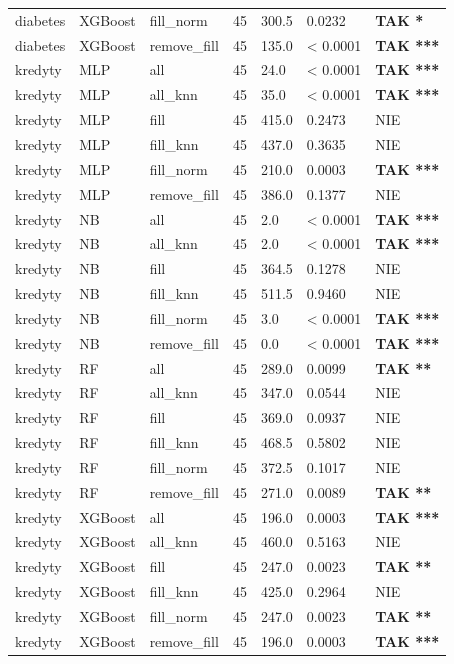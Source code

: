 \begin{table}[htbp]
\begin{tabular}{lllrlll}
diabetes & XGBoost & fill_norm & 45 & 300.5 & 0.0232 & \textbf{TAK *} \\
diabetes & XGBoost & remove_fill & 45 & 135.0 & < 0.0001 & \textbf{TAK ***} \\
kredyty & MLP & all & 45 & 24.0 & < 0.0001 & \textbf{TAK ***} \\
kredyty & MLP & all_knn & 45 & 35.0 & < 0.0001 & \textbf{TAK ***} \\
kredyty & MLP & fill & 45 & 415.0 & 0.2473 & NIE \\
kredyty & MLP & fill_knn & 45 & 437.0 & 0.3635 & NIE \\
kredyty & MLP & fill_norm & 45 & 210.0 & 0.0003 & \textbf{TAK ***} \\
kredyty & MLP & remove_fill & 45 & 386.0 & 0.1377 & NIE \\
kredyty & NB & all & 45 & 2.0 & < 0.0001 & \textbf{TAK ***} \\
kredyty & NB & all_knn & 45 & 2.0 & < 0.0001 & \textbf{TAK ***} \\
kredyty & NB & fill & 45 & 364.5 & 0.1278 & NIE \\
kredyty & NB & fill_knn & 45 & 511.5 & 0.9460 & NIE \\
kredyty & NB & fill_norm & 45 & 3.0 & < 0.0001 & \textbf{TAK ***} \\
kredyty & NB & remove_fill & 45 & 0.0 & < 0.0001 & \textbf{TAK ***} \\
kredyty & RF & all & 45 & 289.0 & 0.0099 & \textbf{TAK **} \\
kredyty & RF & all_knn & 45 & 347.0 & 0.0544 & NIE \\
kredyty & RF & fill & 45 & 369.0 & 0.0937 & NIE \\
kredyty & RF & fill_knn & 45 & 468.5 & 0.5802 & NIE \\
kredyty & RF & fill_norm & 45 & 372.5 & 0.1017 & NIE \\
kredyty & RF & remove_fill & 45 & 271.0 & 0.0089 & \textbf{TAK **} \\
kredyty & XGBoost & all & 45 & 196.0 & 0.0003 & \textbf{TAK ***} \\
kredyty & XGBoost & all_knn & 45 & 460.0 & 0.5163 & NIE \\
kredyty & XGBoost & fill & 45 & 247.0 & 0.0023 & \textbf{TAK **} \\
kredyty & XGBoost & fill_knn & 45 & 425.0 & 0.2964 & NIE \\
kredyty & XGBoost & fill_norm & 45 & 247.0 & 0.0023 & \textbf{TAK **} \\
kredyty & XGBoost & remove_fill & 45 & 196.0 & 0.0003 & \textbf{TAK ***} \\

\end{tabular}
\end{table}
